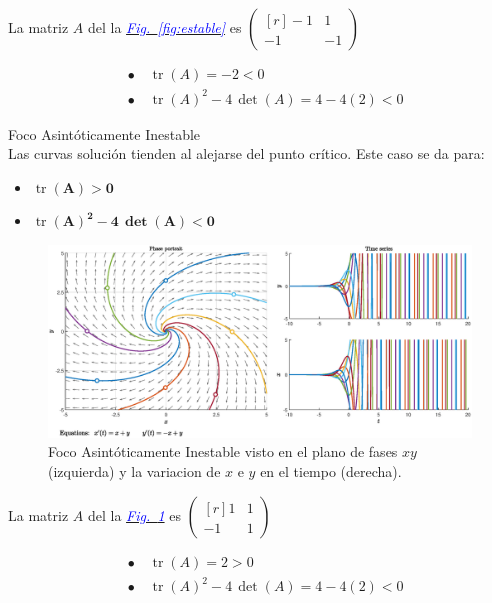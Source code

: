 \documentclass[12pt,a4paper]{report} %
\newcommand{\fref}[1]{\hyperref[#1]{\textcolor{blue}{\textit{Fig.~\ref*{#1}}}}}
\newcommand{\tr}{\operatorname{\textrm{tr}}}
\begin{document}
	La matriz $A$ del la \fref{fig:estable} es 
	$\begin{pmatrix*}[r]
		-1 & 1 \\
		-1 & -1
	\end{pmatrix*}$
	
	\begin{align*}
		&\bullet\quad \tr(A)=-2<0 \\[2mm]
		&\bullet\quad \tr(A)^2-4\, \det(A)=4-4(2)<0
	\end{align*}
	
	\newpage
	
	{\Large\textbullet\quad Foco Asintóticamente Inestable}\\[0.5cm]
	
	Las curvas solución tienden al alejarse del punto crítico. Este caso se da para: 
	\begin{itemize}
		\item \textbf{$\tr$}$\bm{(A)>0}$
		\item \textbf{$\tr$}$\bm{(A)^2-4\, \det(A)<0}$
	\end{itemize}
	
	\begin{figure}[h]
		\centering
		\includegraphics[width=1\textwidth]{inestable.eps}
		\caption{Foco Asintóticamente Inestable visto en el plano de fases $xy$ (izquierda) y la variacion de $x$ e $y$ en el tiempo (derecha).}
		\label{fig:inestable}
	\end{figure}\smallskip
	
	La matriz $A$ del la \fref{fig:inestable} es 
	 $\begin{pmatrix*}[r]
		 1 & 1 \\
		-1 & 1
	 \end{pmatrix*}$
	
	\begin{align*}
		&\bullet\quad \tr(A)=2>0 \\[2mm]
		&\bullet\quad \tr(A)^2-4\, \det(A)=4-4(2)<0
	\end{align*}
	
\end{document}
